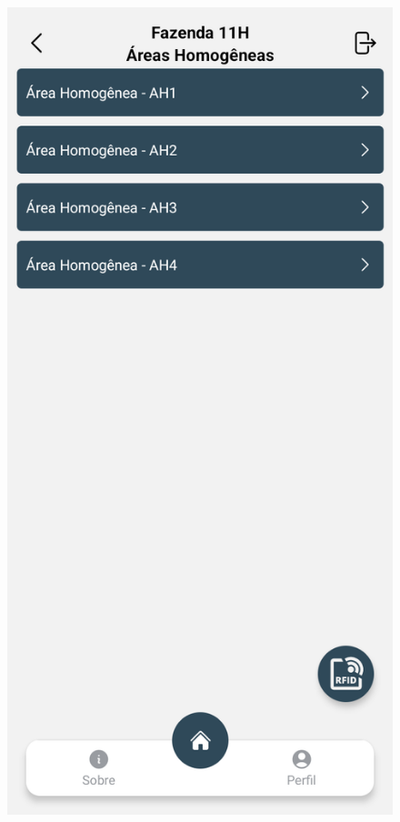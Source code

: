 \begin{figure}[H]
\begin{minipage}[b]{0.30\textwidth}
    \end{minipage}
    \hspace{3pt}
    \begin{minipage}[b]{0.30\textwidth}
        \centering
        \includegraphics[width=\textwidth]{images/app/04-homogeneous-areas.png}

\end{minipage}
\end{figure}
